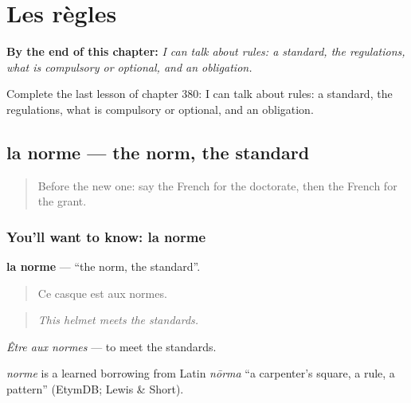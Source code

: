 
\chapter{Les règles}
\label{ch:fr-les-regles}

\begin{chapteropening}
\textbf{By the end of this chapter:} \emph{I can talk about rules: a standard, the regulations, what is compulsory or optional, and an obligation.}

Complete the last lesson of chapter 380: I can talk about rules: a standard, the regulations, what is compulsory or optional, and an obligation.
\end{chapteropening}

\section[la norme]{la norme — the norm, the standard}

\label{lesson:FR-C380-norme}



\begin{quote}
Before the new one: say the French for the doctorate, then the French for the grant.
\end{quote}

\subsection*{You'll want to know: la norme}
\textbf{la norme} — \textquotedblleft{}the norm, the standard\textquotedblright{}.

\begin{quote}
Ce casque est aux normes.
\end{quote}

\begin{quote}
\emph{This helmet meets the standards.}
\end{quote}

\emph{Être aux normes} — to meet the standards.

\begin{cousinweb}
\emph{norme} is a learned borrowing from Latin \emph{nōrma} \textquotedblleft{}a carpenter's square, a rule, a pattern\textquotedblright{} (EtymDB; Lewis \& Short).
\end{cousinweb}

